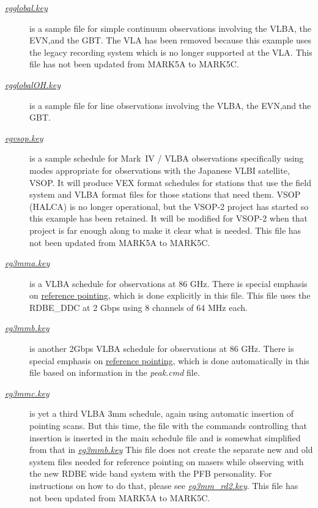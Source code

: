 \documentclass{report}
\begin{document}
\begin{description}
\item[
{\href{examples/egglobal.key}{{\sl egglobal.key}}}]
is a sample file for simple continuum observations involving the VLBA,
the EVN,and the GBT.  The VLA has been removed because this example
uses the legacy recording system which is no longer supported at the
VLA. This file has not been updated from MARK5A to MARK5C.

\item[
{\href{examples/egglobalOH.key}{{\sl egglobalOH.key}}}]
is a sample file for line observations involving the VLBA,
the EVN,and the GBT.

\item[
{\href{examples/egvsop.key}{{\sl egvsop.key}}}] is a
sample schedule for Mark~IV / VLBA observations specifically using
modes appropriate for observations with the Japanese VLBI satellite,
VSOP.  It will produce VEX format schedules for stations that use the
field system and VLBA format files for those stations that need them.
VSOP (HALCA) is no longer operational, but the VSOP-2 project has started
so this example has been retained.  It will be modified for VSOP-2
when that project is far enough along to make it clear what is needed.
This file has not been updated from MARK5A to MARK5C.

\item[
{\href{examples/eg3mma.key}{{\sl eg3mma.key}}}] is a
VLBA schedule for observations at 86 GHz.  There is special emphasis
on 
{\hyperref[SEC:REFPOINT]{reference pointing}}, which is done
explicitly in this file.   This file uses the RDBE\_DDC at 2 Gbps
using 8 channels of 64 MHz each.

\item[
{\href{examples/eg3mmb.key}{{\sl eg3mmb.key}}}] is another 2Gbps
VLBA schedule for observations at 86 GHz.  There is special emphasis
on 
{\hyperref[SEC:REFPOINT]{reference pointing}}, which is done
automatically in this file based on information in the {\sl peak.cmd}
file. 

\item[
{\href{examples/eg3mmc.key}{{\sl eg3mmc.key}}}] is
yet a third VLBA 3mm schedule, again using automatic insertion of
pointing scans.  But this time, the file with the commands controlling
that insertion is inserted in the main schedule file and is somewhat
simplified from that in 
{\href{examples/eg3mmb.key}{{\sl eg3mmb.key}}}
This file does not create the separate new and old system files needed
for reference pointing on masers while observing with the new RDBE wide
band system with the PFB personality.  For instructions on how to do 
that, please see 
{\href{examples/eg3mm\_rd2.key}{{\sl eg3mm\_rd2.key}}}.
This file has not been updated from MARK5A to MARK5C.


\end{description}
\end{document}
